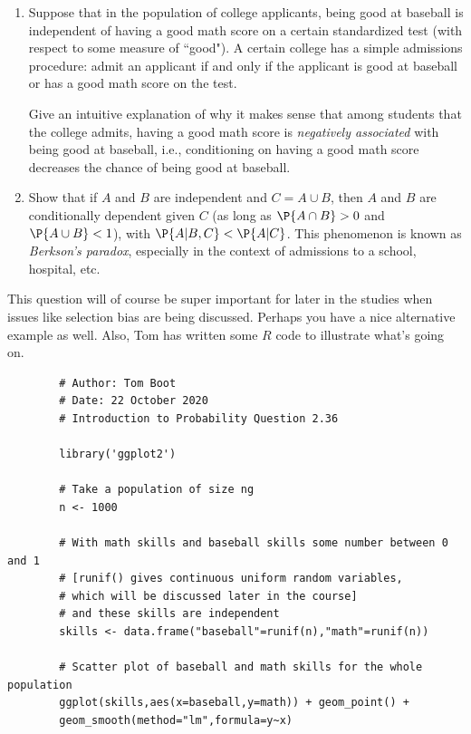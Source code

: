 

\setcounter{theorem}{17}
\begin{exercise}[BH.2.36]
    \begin{enumerate}
        \item Suppose that in the population of college applicants, being good at baseball is independent of having a good math score on a certain standardized test (with respect to some measure of ``good"). A certain college has a simple admissions procedure: admit an applicant if and only if the applicant is good at baseball or has a good math score on the test.

        Give an intuitive explanation of why it makes sense that among students that the college admits, having a good math score is \emph{negatively associated} with being good at baseball, i.e., conditioning on having a good math score decreases the chance of being good at baseball.
        \item Show that if $A$ and $B$ are independent and $C = A \cup B$, then $A$ and $B$ are conditionally dependent given $C$ (as long as $\P{A \cap B} > 0$ and $\P{A \cup B} < 1$), with $\P{A|B, C} < \P{A|C}$. This phenomenon is known as \emph{Berkson's paradox}, especially in the context of admissions to a school, hospital, etc.
    \end{enumerate}
\begin{solution}
    This question will of course be super important for later in the studies when issues like selection bias are being discussed. Perhaps you have a nice alternative example as well. Also, Tom has written some $R$ code to illustrate what's going on.
    \begin{verbatim}
        # Author: Tom Boot
        # Date: 22 October 2020
        # Introduction to Probability Question 2.36

        library('ggplot2')

        # Take a population of size ng
        n <- 1000

        # With math skills and baseball skills some number between 0 and 1
        # [runif() gives continuous uniform random variables,
        # which will be discussed later in the course]
        # and these skills are independent
        skills <- data.frame("baseball"=runif(n),"math"=runif(n))

        # Scatter plot of baseball and math skills for the whole population
        ggplot(skills,aes(x=baseball,y=math)) + geom_point() +
        geom_smooth(method="lm",formula=y~x)


\end{verbatim}
\end{solution}
\end{exercise}
